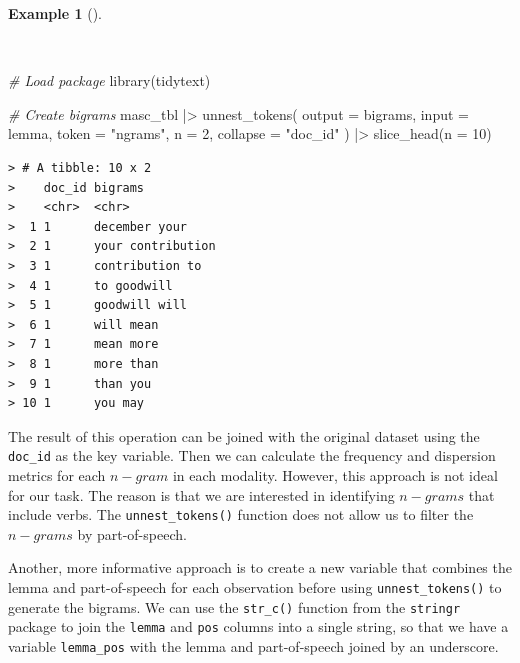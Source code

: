\documentclass[
  letterpaper,
  DIV=11,
  numbers=noendperiod]{scrreport}
\newenvironment{Shaded}{\begin{snugshade}}{\end{snugshade}}
\newcommand{\AttributeTok}[1]{\textcolor[rgb]{0.00,0.00,0.00}{#1}}
\newcommand{\CommentTok}[1]{\textcolor[rgb]{0.00,0.00,0.00}{\textit{#1}}}
\newcommand{\DecValTok}[1]{\textcolor[rgb]{0.00,0.00,0.00}{#1}}
\newcommand{\FunctionTok}[1]{\textcolor[rgb]{0.00,0.00,0.00}{#1}}
\newcommand{\NormalTok}[1]{\textcolor[rgb]{0.00,0.00,0.00}{#1}}
\newcommand{\SpecialCharTok}[1]{\textcolor[rgb]{0.00,0.00,0.00}{#1}}
\newcommand{\StringTok}[1]{\textcolor[rgb]{0.00,0.00,0.00}{#1}}
\theoremstyle{definition}
\newtheorem{example}{Example}[chapter]
\theoremstyle{remark}
\begin{document}
\begin{example}[]\protect\hypertarget{exm-eda-masc-bigrams-tidytext}{}\label{exm-eda-masc-bigrams-tidytext}

~

\begin{Shaded}
\begin{Highlighting}[]
\CommentTok{\# Load package}
\FunctionTok{library}\NormalTok{(tidytext)}

\CommentTok{\# Create bigrams}
\NormalTok{masc\_tbl }\SpecialCharTok{|\textgreater{}} 
  \FunctionTok{unnest\_tokens}\NormalTok{(}
    \AttributeTok{output =}\NormalTok{ bigrams, }
    \AttributeTok{input =}\NormalTok{ lemma, }
    \AttributeTok{token =} \StringTok{"ngrams"}\NormalTok{, }
    \AttributeTok{n =} \DecValTok{2}\NormalTok{, }
    \AttributeTok{collapse =} \StringTok{"doc\_id"}
\NormalTok{    ) }\SpecialCharTok{|\textgreater{}} 
  \FunctionTok{slice\_head}\NormalTok{(}\AttributeTok{n =} \DecValTok{10}\NormalTok{)}
\end{Highlighting}
\end{Shaded}

\begin{verbatim}
> # A tibble: 10 x 2
>    doc_id bigrams          
>    <chr>  <chr>            
>  1 1      december your    
>  2 1      your contribution
>  3 1      contribution to  
>  4 1      to goodwill      
>  5 1      goodwill will    
>  6 1      will mean        
>  7 1      mean more        
>  8 1      more than        
>  9 1      than you         
> 10 1      you may
\end{verbatim}

\end{example}

The result of this operation can be joined with the original dataset
using the \texttt{doc\_id} as the key variable. Then we can calculate
the frequency and dispersion metrics for each \(n-gram\) in each
modality. However, this approach is not ideal for our task. The reason
is that we are interested in identifying \(n-grams\) that include verbs.
The \texttt{unnest\_tokens()} function does not allow us to filter the
\(n-grams\) by part-of-speech.

Another, more informative approach is to create a new variable that
combines the lemma and part-of-speech for each observation before using
\texttt{unnest\_tokens()} to generate the bigrams. We can use the
\texttt{str\_c()} function from the \texttt{stringr} package to join the
\texttt{lemma} and \texttt{pos} columns into a single string, so that we
have a variable \texttt{lemma\_pos} with the lemma and part-of-speech
joined by an underscore.
\end{document}
